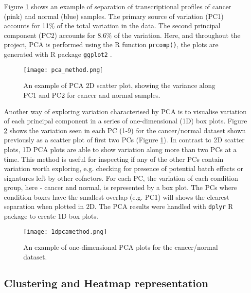     Figure \ref{fig:pcamethod} shows an example of separation of transcriptional profiles of cancer (pink) and normal (blue) samples. The primary source of variation (PC1) accounts for 11\% of the total variation in the data. The second principal component (PC2) accounts for 8.6\% of the variation. 
    Here, and throughout the project, PCA is performed using the R function \texttt{prcomp()}, the plots are generated with R package \texttt{ggplot2} \cite{ggplot2}.
    
            \begin{figure}[!h]
            \centering
            \texttt{[image: pca\_method.png]}
            \caption{An example of PCA 2D scatter plot, showing the variance along PC1 and PC2 for cancer and normal samples.}
            \label{fig:pcamethod}
            \end{figure}
        
    \newpage
    Another way of exploring variation characterised by PCA is to visualise variation of each principal component in a series of one-dimensional (1D) box plots. Figure \ref{fig:1dpcamethod} shows the variation seen in each PC (1-9) for the cancer/normal dataset shown previously as a scatter plot of first two PCs (Figure \ref{fig:pcamethod}). 
    In contrast to 2D scatter plots, 1D PCA plots are able to show variation along more than two PCs at a time. This method is useful for inspecting if any of the other PCs contain variation worth exploring, e.g. checking for presence of potential batch effects or signatures left by other cofactors. 
    For each PC, the variation of each condition group, here - cancer and normal, is represented by a box plot. The PCs where condition boxes have the smallest overlap (e.g. PC1) will shows the clearest separation when plotted in 2D. The PCA results were handled with \texttt{dplyr} R package \cite{wickham2015dplyr} to create 1D box plots. \\
       
    
            \begin{figure}[h]
            \centering
            \texttt{[image: 1dpcamethod.png]}
            \caption{An example of one-dimensional PCA plots for the cancer/normal dataset. }
            \label{fig:1dpcamethod}
            \end{figure}
   
  
    \subsection{Clustering and Heatmap representation}
    
